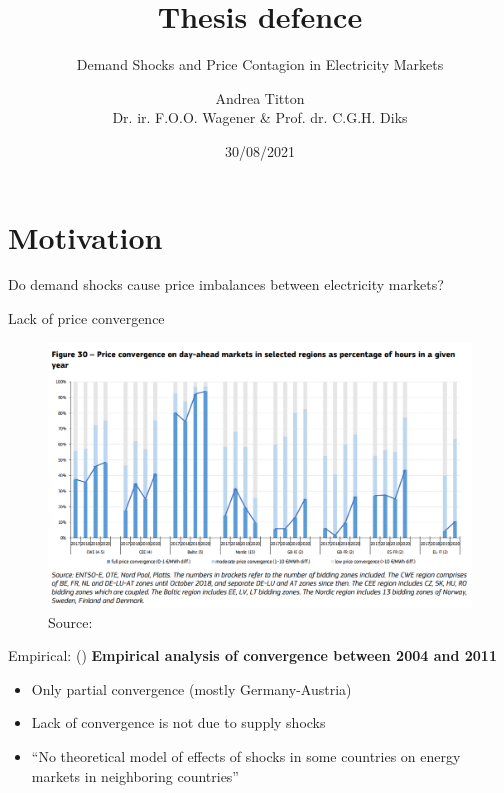 \documentclass{beamer}
\author[Andrea Titton]{Andrea Titton\\[1ex]  {\small Dr. ir. F.O.O. Wagener \& Prof. dr. C.G.H. Diks}}
\title{Thesis defence}
\subtitle{Demand Shocks and Price Contagion in Electricity Markets}
\institute{Tinbergen Institute}
\date{30/08/2021}
\begin{document}

\frame{\titlepage}

\begin{frame}
    \tableofcontents
\end{frame}

\section{Motivation}

\begin{frame}
    Do demand shocks cause price imbalances between electricity markets?
\end{frame}

\begin{frame}{Lack of price convergence}
    \begin{figure}
        \includegraphics[height = 0.7\textheight]{figures/convergence.PNG}
        \\ Source: \cite{Report2019}
    \end{figure}
\end{frame}

\begin{frame}{Empirical: \citeauthor{Bockers2014} (\citeyear{Bockers2014})}
    \textbf{Empirical analysis of convergence between 2004 and 2011}

    \begin{itemize} \setlength\itemsep{1.5em}
              \pause \item Only partial convergence (mostly Germany-Austria)
              \pause \item Lack of convergence is not due to supply shocks
              \pause \item ``No theoretical model of effects of shocks in some countries on energy markets in neighboring countries''
    \end{itemize}

\end{frame}
\end{document}
